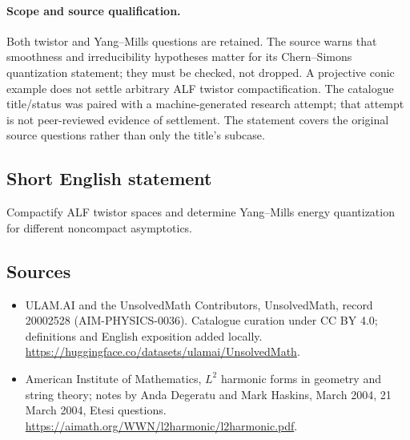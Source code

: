 \documentclass[11pt]{article}
\begin{document}
\paragraph{Scope and source qualification.}Both twistor and Yang–Mills questions are retained. The source warns that smoothness and irreducibility hypotheses matter for its Chern–Simons quantization statement; they must be checked, not dropped. A projective conic example does not settle arbitrary ALF twistor compactification. The catalogue title/status was paired with a machine-generated research attempt; that attempt is not peer-reviewed evidence of settlement. The statement covers the original source questions rather than only the title’s subcase.
\subsection{Short English statement}
Compactify ALF twistor spaces and determine Yang–Mills energy quantization for different noncompact asymptotics.
\subsection{Sources}
\begin{itemize}
\item[\hypertarget{source:20002528:1}{S1}] ULAM.AI and the UnsolvedMath Contributors, UnsolvedMath, record 20002528 (AIM-PHYSICS-0036). Catalogue curation under CC BY 4.0; definitions and English exposition added locally.
\url{https://huggingface.co/datasets/ulamai/UnsolvedMath}.
\item[\hypertarget{source:20002528:2}{S2}] American Institute of Mathematics, $L^2$ harmonic forms in geometry and string theory; notes by Anda Degeratu and Mark Haskins, March 2004, 21 March 2004, Etesi questions.
\url{https://aimath.org/WWN/l2harmonic/l2harmonic.pdf}.
\end{itemize}
\label{end:20002528}
\end{document}
